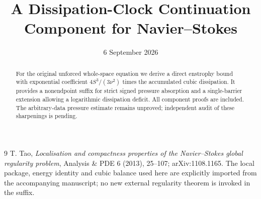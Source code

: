 \documentclass[11pt]{article}
\title{A Dissipation-Clock Continuation Component for Navier--Stokes}
\author{}
\date{6 September 2026}
\begin{document}
\maketitle
\begin{abstract}
For the original unforced whole-space equation we derive a direct enstrophy
bound with exponential coefficient $4S^3/(3\nu^2)$ times the accumulated
cubic dissipation.  It provides a nonendpoint suffix for strict signed
pressure absorption and a single-barrier extension allowing a logarithmic
dissipation deficit.  All component proofs are included.  The arbitrary-data
pressure estimate remains unproved; independent audit of these sharpenings
is pending.
\end{abstract}

\begin{thebibliography}{9}
 T. Tao, \emph{Localisation and compactness properties of the
Navier--Stokes global regularity problem}, Analysis \& PDE 6 (2013),
25--107; arXiv:1108.1165.  The local package, energy identity and cubic
balance used here are explicitly imported from the accompanying manuscript;
no new external regularity theorem is invoked in the suffix.
\end{thebibliography}
\end{document}
